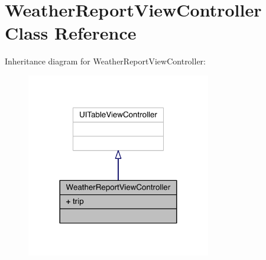 \hypertarget{interface_weather_report_view_controller}{\section{Weather\-Report\-View\-Controller Class Reference}
\label{interface_weather_report_view_controller}
}


Inheritance diagram for Weather\-Report\-View\-Controller\-:\nopagebreak
\begin{figure}[H]
\begin{center}
\leavevmode
\includegraphics[width=228pt]{interface_weather_report_view_controller__inherit__graph}
\end{center}
\end{figure}


